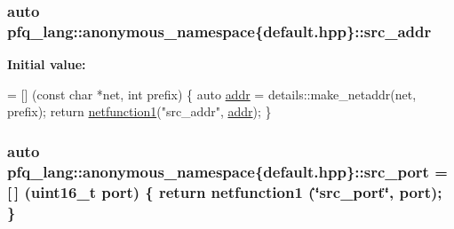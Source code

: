 \hypertarget{namespacepfq__lang_1_1anonymous__namespace_02default_8hpp_03_a63c87ff605d7cefa807fd61bc463785d}{
\subsubsection[{src\+\_\+addr}]{\setlength{\rightskip}{0pt plus 5cm}auto pfq\+\_\+lang\+::anonymous\+\_\+namespace\{default.\+hpp\}\+::src\+\_\+addr}}\label{namespacepfq__lang_1_1anonymous__namespace_02default_8hpp_03_a63c87ff605d7cefa807fd61bc463785d}
{\bfseries Initial value\+:}
\begin{DoxyCode}
= [] (\textcolor{keyword}{const} \textcolor{keywordtype}{char} *net, \textcolor{keywordtype}{int} prefix)
        \{
            \textcolor{keyword}{auto} \hyperlink{namespacepfq__lang_1_1anonymous__namespace_02default_8hpp_03_aafce8334d1be83bff9a2115439c8c453}{addr} = details::make\_netaddr(net, prefix);
            \textcolor{keywordflow}{return} \hyperlink{namespacepfq__lang_af215f25fa7ebd61fdc90cf0ef78a3164}{netfunction1}(\textcolor{stringliteral}{"src\_addr"}, \hyperlink{namespacepfq__lang_1_1anonymous__namespace_02default_8hpp_03_aafce8334d1be83bff9a2115439c8c453}{addr});
        \}
\end{DoxyCode}
\hypertarget{namespacepfq__lang_1_1anonymous__namespace_02default_8hpp_03_ad4d03d1e69ba9608a2d87ac91a2b521f}{
\subsubsection[{src\+\_\+port}]{\setlength{\rightskip}{0pt plus 5cm}auto pfq\+\_\+lang\+::anonymous\+\_\+namespace\{default.\+hpp\}\+::src\+\_\+port = \mbox{[}$\,$\mbox{]} (uint16\+\_\+t {\bf port}) \{ return {\bf netfunction1} (\char`\"{}src\+\_\+port\char`\"{}, port); \}}}\label{namespacepfq__lang_1_1anonymous__namespace_02default_8hpp_03_ad4d03d1e69ba9608a2d87ac91a2b521f}
